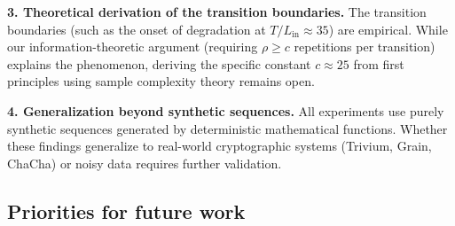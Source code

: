 \documentclass[11pt]{article}
\theoremstyle{plain}
\theoremstyle{definition}
\begin{document}
\textbf{3. Theoretical derivation of the transition boundaries.} The transition boundaries (such as the onset of degradation at $T/L_{\mathrm{in}} \approx 35$) are empirical. While our information-theoretic argument (requiring $\rho \geq c$ repetitions per transition) explains the phenomenon, deriving the specific constant $c \approx 25$ from first principles using sample complexity theory remains open.

\textbf{4. Generalization beyond synthetic sequences.} All experiments use purely synthetic sequences generated by deterministic mathematical functions. Whether these findings generalize to real-world cryptographic systems (Trivium, Grain, ChaCha) or noisy data requires further validation.

\subsection{Priorities for future work}
\label{sec:future}
\end{document}
